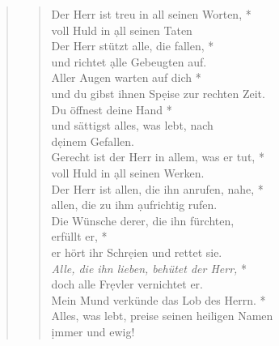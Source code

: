 \vspace{0.3cm}

\def\greinitialformat#1{{\fontsize{40}{40}\selectfont #1}}
\gresetfirstlineaboveinitial{\small \textcolor{red}{Ps 145b}}{}
\setaboveinitialseparation{0.72mm}

\vspace{0.3cm}
\begin{quote}
\begin{verse}
 Der Herr ist treu in all seinen Worten, *\\ voll Huld in \d all seinen Taten\\
\vin Der Herr stützt alle, die fallen, *\\
\vin und richtet \d alle Gebeugten auf. \\
Aller Augen warten auf dich *\\
und du gibst ihnen Sp\d eise zur rechten Zeit. \\
\vin Du öffnest deine Hand *\\
\vin und sättigst alles, was lebt, nach\\ \vin d\d einem Gefallen. \\
Gerecht ist der Herr in allem, was er tut, *\\
voll Huld in \d all seinen Werken. \\
\vin Der Herr ist allen, die ihn anrufen, nahe, *\\
\vin allen, die zu ihm \d aufrichtig rufen. \\
Die Wünsche derer, die ihn fürchten,\\ erfüllt er, *\\
er hört ihr Schr\d eien und rettet sie. \\
\vin \textit{Alle, die ihn lieben, behütet der Herr,} *\\
\vin doch alle Fr\d evler vernichtet er. \\
Mein Mund verkünde das Lob des Herrn. *\\
Alles, was lebt, preise seinen heiligen Namen \\\d immer und ewig! \\
\end{verse}

 \end{quote}





